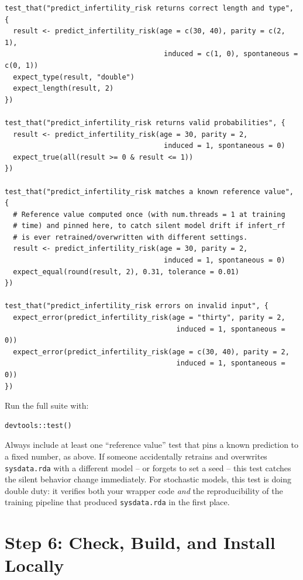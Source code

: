 \documentclass[11pt]{article}
\begin{document}
\begin{lstlisting}
test_that("predict_infertility_risk returns correct length and type", {
  result <- predict_infertility_risk(age = c(30, 40), parity = c(2, 1),
                                      induced = c(1, 0), spontaneous = c(0, 1))
  expect_type(result, "double")
  expect_length(result, 2)
})

test_that("predict_infertility_risk returns valid probabilities", {
  result <- predict_infertility_risk(age = 30, parity = 2,
                                      induced = 1, spontaneous = 0)
  expect_true(all(result >= 0 & result <= 1))
})

test_that("predict_infertility_risk matches a known reference value", {
  # Reference value computed once (with num.threads = 1 at training
  # time) and pinned here, to catch silent model drift if infert_rf
  # is ever retrained/overwritten with different settings.
  result <- predict_infertility_risk(age = 30, parity = 2,
                                      induced = 1, spontaneous = 0)
  expect_equal(round(result, 2), 0.31, tolerance = 0.01)
})

test_that("predict_infertility_risk errors on invalid input", {
  expect_error(predict_infertility_risk(age = "thirty", parity = 2,
                                         induced = 1, spontaneous = 0))
  expect_error(predict_infertility_risk(age = c(30, 40), parity = 2,
                                         induced = 1, spontaneous = 0))
})
\end{lstlisting}

Run the full suite with:

\begin{lstlisting}
devtools::test()
\end{lstlisting}

\begin{warnbox}
Always include at least one ``reference value'' test that pins a known prediction to a fixed number, as above. If someone accidentally retrains and overwrites \texttt{sysdata.rda} with a different model -- or forgets to set a seed -- this test catches the silent behavior change immediately. For stochastic models, this test is doing double duty: it verifies both your wrapper code \emph{and} the reproducibility of the training pipeline that produced \texttt{sysdata.rda} in the first place.
\end{warnbox}

\section{Step 6: Check, Build, and Install Locally}
\end{document}
